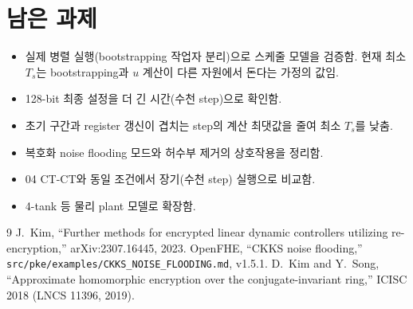 \documentclass[11pt,a4paper]{article}
\begin{document}
\section{남은 과제}
\begin{itemize}
\item 실제 병렬 실행(bootstrapping 작업자 분리)으로 스케줄 모델을 검증함.
      현재 최소 $T_s$는 bootstrapping과 $u$ 계산이 다른 자원에서 돈다는 가정의 값임.
\item 128-bit 최종 설정을 더 긴 시간(수천 step)으로 확인함.
\item 초기 구간과 register 갱신이 겹치는 step의 계산 최댓값을 줄여 최소 $T_s$를 낮춤.
\item 복호화 noise flooding 모드와 허수부 제거의 상호작용을 정리함.
\item 04 CT-CT와 동일 조건에서 장기(수천 step) 실행으로 비교함.
\item 4-tank 등 물리 plant 모델로 확장함.
\end{itemize}

\begin{thebibliography}{9}
 J.~Kim, ``Further methods for encrypted linear dynamic controllers utilizing re-encryption,'' arXiv:2307.16445, 2023.
 OpenFHE, ``CKKS noise flooding,'' \texttt{src/pke/examples/CKKS\_NOISE\_FLOODING.md}, v1.5.1.
 D.~Kim and Y.~Song, ``Approximate homomorphic encryption over the conjugate-invariant ring,'' ICISC 2018 (LNCS 11396, 2019).
\end{thebibliography}
\end{document}
